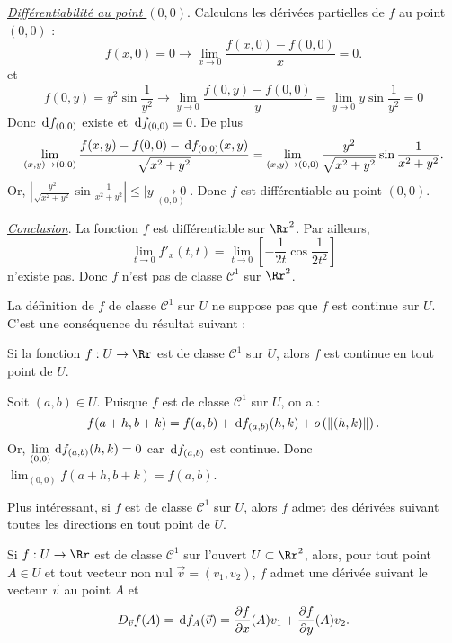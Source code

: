 \documentclass[class=report,crop=false]{standalone}
\begin{document}
\vskip4mm

\noindent \underline{\it Différentiabilité au point $(0,0)$}. Calculons les dérivées partielles de $f$ au point $(0,0)$ :
$$f(x,0)=0 \rightarrow \lim _{x\to 0}\frac{f(x,0)-f(0,0)}{x}=0.$$
et
$$f(0,y)=y^2\sin \frac{1}{y^2} \rightarrow \lim _{y\to 0}\frac{f(0,y)-f(0,0)}{y}=\lim _{y\to 0}y\sin \frac{1}{y^2}=0$$
Donc $\,\mathrm{d} f_{(0,0)}$ existe et $\,\mathrm{d} f_{(0,0)}\equiv 0$. De plus
$$\lim _{(x,y)\to (0,0)}\frac{f(x,y)-f(0,0)-\,\mathrm{d} f_{(0,0)}(x,y)}{\sqrt{x^2+y^2}}=\lim _{(x,y)\to (0,0)}\frac{y^2}{\sqrt{x^2+y^2}}\sin \frac{1}{x^2+y^2}.$$
Or, $\displaystyle \left|\frac{y^2}{\sqrt{x^2+y^2}}\sin \frac{1}{x^2+y^2}\right|\leq |y|\underset{(0,0)\;\;}{\longrightarrow 0}$. Donc $f$ est différentiable au point $(0,0)$.

\vskip4mm

\noindent \underline{\it Conclusion}. La fonction $f$ est différentiable sur $\Rr^2$. Par ailleurs, 
$$\lim _{t\to 0}f'_x(t,t)=\lim _{t\to 0}\left[-\frac{1}{2t}\cos \frac{1}{2t^2}\right]$$ n'existe pas. Donc $f$ n'est pas de classe $\mathscr{C}^1$ sur $\Rr^2$.

\vskip6mm

\noindent La définition de $f$ de classe $\mathscr{C}^1$ sur $U$ ne suppose pas que $f$ est continue sur $U$. C'est une conséquence du résultat suivant :

\vskip6mm

\begin{corollaire}
Si la fonction $f:U\to \Rr$ est de classe $\mathscr{C}^1$ sur $U$, alors $f$ est continue en tout point de $U$.
\end{corollaire}

\vskip4mm

Soit $(a,b)\in U$. Puisque $f$ est de classe $\mathscr{C}^1$ sur $U$, on a :
$$f(a+h,b+k)=f(a,b)+\,\mathrm{d} f_{(a,b)}(h,k)+o\left(\|(h,k)\|\right).$$
Or, $\displaystyle \lim _{(0,0)}\,\mathrm{d} f_{(a,b)}(h,k)=0$ car $\,\mathrm{d} f_{(a,b)}$ est continue. Donc $\displaystyle \lim _{(0,0)}f(a+h,b+k)=f(a,b)$.

\vskip6mm

\noindent Plus intéressant, si $f$ est de classe $\mathscr{C}^1$ sur $U$, alors $f$ admet des dérivées suivant toutes les directions en tout point de $U$.

\vskip6mm

\begin{corollaire}Si $f:U\to \Rr$ est de classe $\mathscr{C}^1$ sur l'ouvert $U\subset \Rr^2$, alors, pour tout point $A\in U$ et tout vecteur non nul $\vec{v}=(v_1,v_2)$, $f$ admet une dérivée suivant le vecteur $\vec{v}$ au point $A$ et
$$D_{\vec{v}}f(A)=\,\mathrm{d} f_{A}(\vec{v})=\frac{\partial f}{\partial x}(A)v_1+\frac{\partial f}{\partial y}(A)v_2.$$
\end{corollaire}
\end{document}

